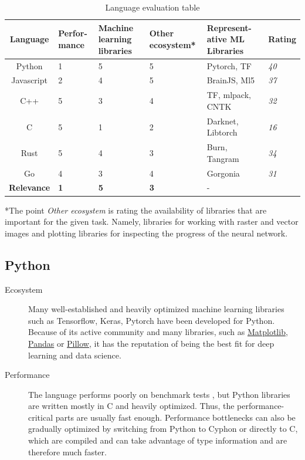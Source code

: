 \documentclass[12pt, a4paper, titlepage]{report}
\begin{document}
\begin{table}
   \begin{tabular} {|c||p{1.5cm}|p{2.0cm}|p{1.5cm}|p{2.5cm}||p{2.2cm}|}
      \hline
      \textbf{Language}    & \textbf{Perfor-mance} & \textbf{Machine learning libraries} & \textbf{Other ecosystem*} & \textbf{Represent-ative ML Libraries} & \textbf{Rating} \\
      \hline
      Python      & 1 & 5 & 5 & Pytorch, TF        & \emph{40} \\ \hline
      Javascript  & 2 & 4 & 5 & BrainJS, Ml5       & \emph{37} \\ \hline
      C++         & 5 & 3 & 4 & TF, mlpack, CNTK   & \emph{32} \\ \hline
      C           & 5 & 1 & 2 & Darknet, Libtorch  & \emph{16} \\ \hline
      Rust        & 5 & 4 & 3 & Burn, Tangram      & \emph{34} \\ \hline
      Go          & 4 & 3 & 4 & Gorgonia           & \emph{31} \\
      \hline\hline
      \textbf{Relevance} & \textbf{1} & \textbf{5} & \textbf{3} & - & \\
      \hline
   \end{tabular}
   \caption{Language evaluation table}
   \label{table:language_evaluation}
\end{table}

\vspace{0.5cm}
*The point \emph{Other ecosystem} is rating the availability of libraries that are important for the given task. Namely, libraries for working with raster and vector images and plotting libraries for inspecting the progress of the neural network.

{
   \center
   \subsection*{Python}
}
\begin{description}
   \item[Ecosystem] Many well-established and heavily optimized machine learning libraries such as Tensorflow, Keras, Pytorch have been developed for Python. Because of its active community and many libraries, such as \href{}{Matplotlib}, \href{}{Pandas} or \href{}{Pillow}, it has the reputation of being the best fit for deep learning and data science.
   \item[Performance] The language performs poorly on benchmark tests \cite{goodmanwen_programming-language-benchmarks-visualization_2023}, but Python libraries are written mostly in C and heavily optimized. Thus, the performance-critical parts are usually fast enough. Performance bottlenecks can also be gradually optimized by switching from Python to Cyphon or directly to C, which are compiled and can take advantage of type information and are therefore much faster.
\end{description}
\end{document}

